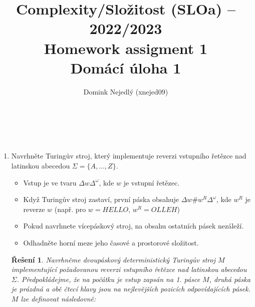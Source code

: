 \documentclass[a4paper]{article}
\title{Complexity/Složitost (SLOa) – 2022/2023\\[0.4ex] \large Homework assigment 1\\[0.4ex] Domácí úloha 1}
\author{Domink Nejedlý (xnejed09)}
\makeatletter
\let\blank\Delta
\theoremstyle{result}
\newtheorem*{result}{Řešení}
\renewcommand\maketitle{
{\raggedright
\begin{center}
{\Large \bfseries \@title}\\[2ex]
{\@author}\\[8ex] 
\end{center}}}
\makeatother
\begin{document}
\maketitle





\begin{enumerate}



    \item Navrhněte Turingův stroj, který implementuje reverzi vstupního řetězce nad latinskou abecedou $\Sigma = \{A, \dots, Z\}$.
    
    \begin{itemize}
        \item Vstup je ve tvaru $\blank w\blank^\omega$, kde $w$ je vstupní řetězec.
        \item Když Turingův stroj zastaví, první páska obsahuje $\blank w\#w^R\blank^\omega$, kde $w^R$ je reverze $w$ (např. pro $w = HELLO$, $w^R = OLLEH$)
        \item Pokud navrhnete vícepáskový stroj, na obsahu ostatních pásek nezáleží.
        \item Odhadněte horní meze jeho časové a prostorové složitost.
    \end{itemize}

    \begin{result}
        Navrhněme dvoupáskový deterministický Turingův stroj $M$ implementující požadovanou reverzi vstupního řetězce nad latinskou abecedou $\Sigma$. Předpokládejme, že na počátku je vstup zapsán na 1. pásce $M$, druhá páska je prázdná a obě čtecí hlavy jsou na nejlevějších pozicích odpovídajících pásek. $M$ lze definovat následovně:

        \begin{figure}[h]
            \centering
            
\end{figure}
\end{result}
\end{enumerate}
\end{document}
